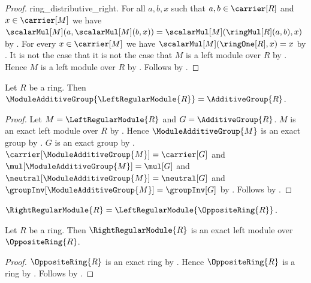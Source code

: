 \begin{proof}
{            ring_distributive_right}.
    For all $a,b,x$ such that
        $a,b\in\carrier[R]$ and $x\in\carrier[M]$ we have
        $\scalarMul[M](a,\scalarMul[M](b,x))
            =\scalarMul[M](\ringMul[R](a,b),x)$ by
        .
    For every $x\in\carrier[M]$ we have
        $\scalarMul[M](\ringOne[R],x)=x$ by
        .
    It is not the case that it is not the case that
        $M$ is a left module over $R$ by
        .
    Hence $M$ is a left module over $R$ by \auto.
    Follows by
        .
\end{proof}

\begin{theorem}\label{spike_left_regular_module_additive_reduct}
    Let $R$ be a ring.
    Then
        $\ModuleAdditiveGroup{\LeftRegularModule{R}}
            =\AdditiveGroup{R}$.
\end{theorem}
\begin{proof}
    Let $M=\LeftRegularModule{R}$ and $G=\AdditiveGroup{R}$.
    $M$ is an exact left module over $R$ by
        .
    Hence $\ModuleAdditiveGroup{M}$ is an exact group by
        .
    $G$ is an exact group by
        .
    $\carrier[\ModuleAdditiveGroup{M}]=\carrier[G]$ and
        $\mul[\ModuleAdditiveGroup{M}]=\mul[G]$ and
        $\neutral[\ModuleAdditiveGroup{M}]=\neutral[G]$ and
        $\groupInv[\ModuleAdditiveGroup{M}]=\groupInv[G]$ by
        .
    Follows by .
\end{proof}

\begin{definition}\label{spike_right_regular_module}
    $\RightRegularModule{R}=\LeftRegularModule{\OppositeRing{R}}$.
\end{definition}

\begin{theorem}\label{spike_right_regular_module_is_exact}
    Let $R$ be a ring.
    Then
        $\RightRegularModule{R}$ is an exact left module over
            $\OppositeRing{R}$.
\end{theorem}
\begin{proof}
    $\OppositeRing{R}$ is an exact ring by
        .
    Hence $\OppositeRing{R}$ is a ring by \auto.
    Follows by
        .
\end{proof}

